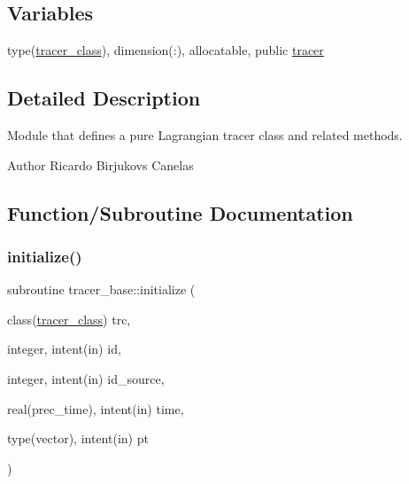 \subsection*{Variables}
\begin{DoxyCompactItemize}
\item 
type(\hyperlink{structtracer__base_1_1tracer__class}{tracer\+\_\+class}), dimension(\+:), allocatable, public \hyperlink{namespacetracer__base_a7f839546575f08e3b944dafdf5e0b2d2}{tracer}
\end{DoxyCompactItemize}


\subsection{Detailed Description}
Module that defines a pure Lagrangian tracer class and related methods. 

\begin{DoxyAuthor}{Author}
Ricardo Birjukovs Canelas 
\end{DoxyAuthor}


\subsection{Function/\+Subroutine Documentation}
\mbox{\label{namespacetracer__base_ad712d20080a9daa44024d61afae670a4}} 
\subsubsection{\texorpdfstring{initialize()}{initialize()}}
{\footnotesize\ttfamily subroutine tracer\+\_\+base\+::initialize (\begin{DoxyParamCaption}\item[{class(\hyperlink{structtracer__base_1_1tracer__class}{tracer\+\_\+class})}]{trc,  }\item[{integer, intent(in)}]{id,  }\item[{integer, intent(in)}]{id\+\_\+source,  }\item[{real(prec\+\_\+time), intent(in)}]{time,  }\item[{type(vector), intent(in)}]{pt }\end{DoxyParamCaption})\hspace{0.3cm}{\ttfamily [private]}}



